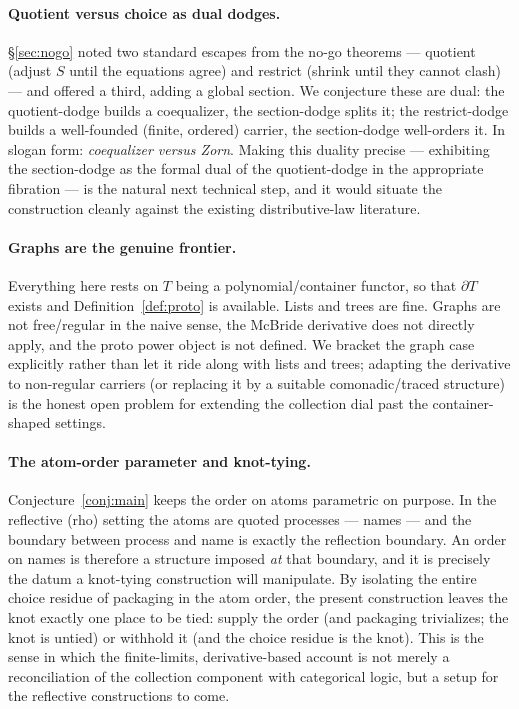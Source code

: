 \documentclass[11pt]{article}
\theoremstyle{definition}
\theoremstyle{plain}
\newcommand{\p}{\partial}
\newcommand{\T}{T}
\newcommand{\Coll}{S}
\begin{document}
\paragraph{Quotient versus choice as dual dodges.} \S\ref{sec:nogo} noted two
standard escapes from the no-go theorems --- quotient (adjust $\Coll$ until the
equations agree) and restrict (shrink until they cannot clash) --- and offered
a third, adding a global section. We conjecture these are dual: the
quotient-dodge builds a coequalizer, the section-dodge splits it; the
restrict-dodge builds a well-founded (finite, ordered) carrier, the
section-dodge well-orders it. In slogan form: \emph{coequalizer versus Zorn}.
Making this duality precise --- exhibiting the section-dodge as the formal dual
of the quotient-dodge in the appropriate fibration --- is the natural next
technical step, and it would situate the construction cleanly against the
existing distributive-law literature.

\paragraph{Graphs are the genuine frontier.} Everything here rests on $\T$
being a polynomial/container functor, so that $\p\T$ exists and
Definition~\ref{def:proto} is available. Lists and trees are fine. Graphs are
not free/regular in the naive sense, the McBride derivative does not directly
apply, and the proto power object is not defined. We bracket the graph case
explicitly rather than let it ride along with lists and trees; adapting the
derivative to non-regular carriers (or replacing it by a suitable
comonadic/traced structure) is the honest open problem for extending the
collection dial past the container-shaped settings.

\paragraph{The atom-order parameter and knot-tying.} Conjecture~\ref{conj:main}
keeps the order on atoms parametric on purpose. In the reflective (rho) setting
the atoms are quoted processes --- names --- and the boundary between process
and name is exactly the reflection boundary. An order on names is therefore a
structure imposed \emph{at} that boundary, and it is precisely the datum a
knot-tying construction will manipulate. By isolating the entire choice residue
of packaging in the atom order, the present construction leaves the knot
exactly one place to be tied: supply the order (and packaging trivializes; the
knot is untied) or withhold it (and the choice residue is the knot). This is
the sense in which the finite-limits, derivative-based account is not merely a
reconciliation of the collection component with categorical logic, but a setup
for the reflective constructions to come.
\end{document}
